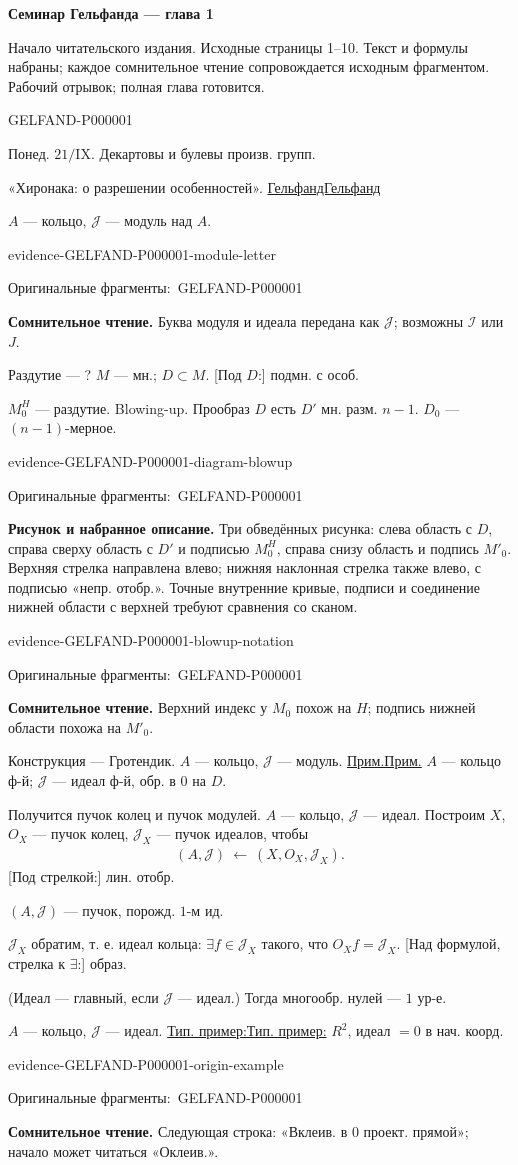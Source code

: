 \documentclass[11pt]{article}
\let\MathUnderline\underline
\renewcommand{\underline}[1]{\ifmmode\MathUnderline{#1}\else\uline{#1}\fi}
\newcommand{\SourcePage}[2]{\par\smallskip\phantomsection\label{#1:source-page}{\small\sffamily\color{blue!55!black}#1}\par\smallskip}
\newcommand{\EvidenceBlock}[4]{%
 \par\smallskip\noindent\begin{minipage}{\linewidth}
 \begin{minipage}[t]{.47\linewidth}\vspace{0pt}\centering
 \csname evidence-#1-#2\endcsname\par
 {\scriptsize\SourceCropCaption\ #1}\par
 \end{minipage}\hfill
 \begin{minipage}[t]{.49\linewidth}\vspace{0pt}\raggedright
 {\small\color{orange!65!black}\textbf{#4} #3}\par
 \end{minipage}
 \end{minipage}\par\smallskip}
\newcommand{\Unclear}[3]{\EvidenceBlock{#1}{#2}{#3}{\ReadingCaption}}
\newcommand{\SourceFigure}[3]{\EvidenceBlock{#1}{#2}{#3}{\DiagramCaption}}
\newcommand{\SourceCropCaption}{Оригинальные фрагменты:}\newcommand{\ReadingCaption}{Сомнительное чтение.}\newcommand{\IncompleteCaption}{Неразобранный фрагмент.}\newcommand{\DiagramCaption}{Рисунок и набранное описание.}
\begin{document}
{\large\bfseries Семинар Гельфанда — глава 1}\par
{\small Начало читательского издания. Исходные страницы 1–10. Текст и формулы набраны; каждое сомнительное чтение сопровождается исходным фрагментом. Рабочий отрывок; полная глава готовится.}\par\medskip
\SourcePage{GELFAND-P000001}{unlabelled}
Понед. $21/\mathrm{IX}$.
Декартовы и булевы произв. групп.

«Хиронака: о разрешении особенностей».
\underline{Гельфанд}

$A$ — кольцо, $\mathcal{J}$ — модуль над $A$.
\Unclear{GELFAND-P000001}{module-letter}{Буква модуля и идеала передана как $\mathcal{J}$; возможны $\mathcal{I}$ или $J$.}

Раздутие — ?
$M$ — мн.; $D\subset M$.
[Под $D$:] подмн. с особ.

$M_0^H$ — раздутие. Blowing-up.
Прообраз $D$ есть $D'$ мн. разм. $n-1$.
$D_0$ — $(n-1)$-мерное.
\SourceFigure{GELFAND-P000001}{diagram-blowup}{Три обведённых рисунка: слева область с $D$, справа сверху область с $D'$ и подписью $M_0^H$, справа снизу область и подпись $M'_0$. Верхняя стрелка направлена влево; нижняя наклонная стрелка также влево, с подписью «непр. отобр.». Точные внутренние кривые, подписи и соединение нижней области с верхней требуют сравнения со сканом.}
\Unclear{GELFAND-P000001}{blowup-notation}{Верхний индекс у $M_0$ похож на $H$; подпись нижней области похожа на $M'_0$.}

Конструкция — Гротендик.
$A$ — кольцо, $\mathcal{J}$ — модуль.
\underline{Прим.} $A$ — кольцо ф-й;
$\mathcal{J}$ — идеал ф-й, обр. в $0$ на $D$.

Получится пучок колец и пучок модулей.
$A$ — кольцо, $\mathcal{J}$ — идеал.
Построим $X$, $O_X$ — пучок колец,
$\mathcal{J}_X$ — пучок идеалов, чтобы
\begin{gather*}
 (A,\mathcal{J})\ \longleftarrow\ (X,O_X,\mathcal{J}_X).
\end{gather*}
[Под стрелкой:] лин. отобр.

$(A,\mathcal{J})$ — пучок, порожд. $1$-м ид.

$\mathcal{J}_X$ обратим, т. е. идеал кольца:
$\exists f\in\mathcal{J}_X$ такого, что $O_Xf=\mathcal{J}_X$.
[Над формулой, стрелка к $\exists$:] образ.

(Идеал — главный, если $\mathcal{J}$ — идеал.)
Тогда многообр. нулей — $1$ ур-е.

$A$ — кольцо, $\mathcal{J}$ — идеал.
\underline{Тип. пример:} $R^2$, идеал $=0$ в нач. коорд.
\Unclear{GELFAND-P000001}{origin-example}{Следующая строка: «Вклеив. в $0$ проект. прямой»; начало может читаться «Оклеив.».}
\end{document}
